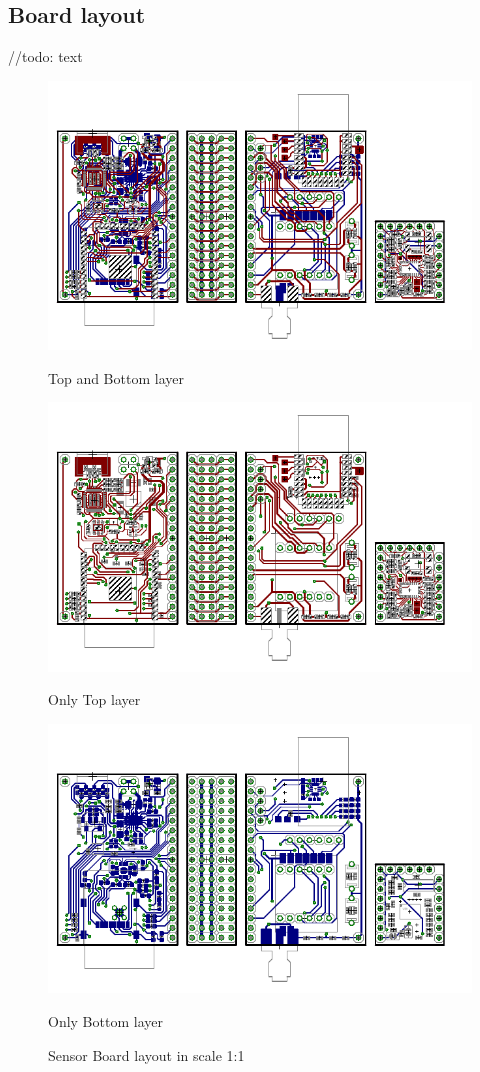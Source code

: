 \documentclass[12pt,a4paper]{article}
\begin{document}
\subsection{Board layout}
//todo: text

\begin{figure}
	\centering
	\includegraphics[scale=1]{img/brd.pdf}
	\begin{center}
		Top and Bottom layer
	\end{center}
	\includegraphics[scale=1]{img/brdTop.pdf}
	\begin{center}
		Only Top layer
	\end{center}
	\includegraphics[scale=1]{img/brdBottom.pdf}
	\begin{center}
		Only Bottom layer
	\end{center}
	\label{brd1}
	\caption{Sensor Board layout in scale 1:1}
\end{figure}
\end{document}
